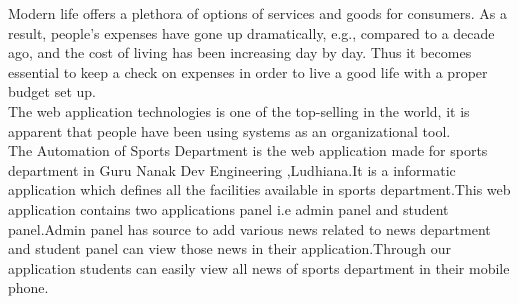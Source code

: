 \begin{Large}
\end{Large}
\vskip 0.1in Modern life offers a plethora of options of services and goods for consumers. As a 
result, people's expenses have gone up dramatically, e.g., compared to a decade ago, and the 
cost of living has been increasing day by day. Thus it becomes essential to keep a check on expenses in order to live a good life with a proper budget set up.  \\

\noindent The web application technologies is one of the top-selling in the world, it is apparent that people have been using systems as an organizational tool.\\

\noindent The Automation of Sports Department is the web application made for sports department in Guru Nanak Dev
Engineering ,Ludhiana.It is a informatic application which defines all the facilities available
in sports department.This web application contains two applications panel i.e admin panel and
student panel.Admin panel has source to add various news related to news department and
student panel can view those news in their application.Through our application students can
easily view all news of sports department in their mobile phone.